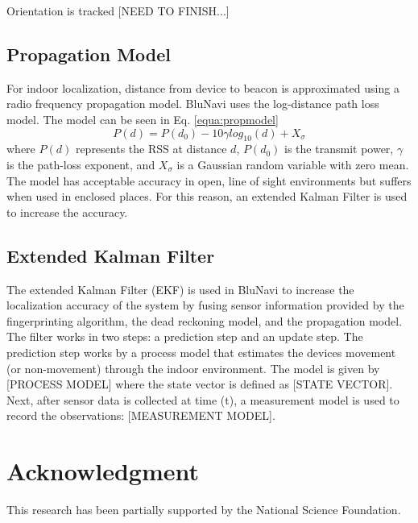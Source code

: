 \documentclass[conference]{IEEEtran}
\begin{document}
Orientation is tracked [NEED TO FINISH...]

\subsection{Propagation Model}
For indoor localization, distance from device to beacon is approximated using a radio frequency propagation model. BluNavi uses the log-distance path loss model. The model can be seen in Eq. \ref{equa:propmodel}
\begin{equation}
\label{equa:propmodel}
P(d) = P(d_0) - 10{\gamma}log_{10}(d) + X_\sigma
\end{equation}
where $P(d)$ represents the RSS at distance $d$, $P(d_0)$ is the transmit power, $\gamma$ is the path-loss exponent, and $X_\sigma$ is a Gaussian random variable with zero mean. The model has acceptable accuracy in open, line of sight environments but suffers when used in enclosed places. For this reason, an extended Kalman Filter is used to increase the accuracy.

\subsection{Extended Kalman Filter}
The extended Kalman Filter (EKF) is used in BluNavi to increase the localization accuracy of the system by fusing sensor information provided by the fingerprinting algorithm, the dead reckoning model, and the propagation model. The filter works in two steps: a prediction step and an update step. The prediction step works by a process model that estimates the devices movement (or non-movement) through the indoor environment. The model is given by [PROCESS MODEL] where the state vector is defined as [STATE VECTOR]. Next, after sensor data is collected at time (t), a measurement model is used to record the observations: [MEASUREMENT MODEL].



\section*{Acknowledgment}
This research has been partially supported by the National Science Foundation.




\end{document}
